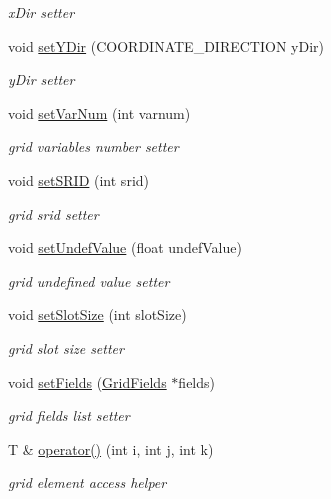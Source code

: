 \begin{DoxyCompactItemize}
\begin{DoxyCompactList}\small\item\em x\-Dir setter \end{DoxyCompactList}\item 
void \hyperlink{classfwi_1_1grid_1_1Grid_a8ee82188e306a47c14813024513bd56e}{set\-Y\-Dir} (C\-O\-O\-R\-D\-I\-N\-A\-T\-E\-\_\-\-D\-I\-R\-E\-C\-T\-I\-O\-N y\-Dir)
\begin{DoxyCompactList}\small\item\em y\-Dir setter \end{DoxyCompactList}\item 
void \hyperlink{classfwi_1_1grid_1_1Grid_ab063dbc1b9e23f21c27611851390de23}{set\-Var\-Num} (int varnum)
\begin{DoxyCompactList}\small\item\em grid variables number setter \end{DoxyCompactList}\item 
void \hyperlink{classfwi_1_1grid_1_1Grid_aff98dae08698282b2a1661810856e673}{set\-S\-R\-I\-D} (int srid)
\begin{DoxyCompactList}\small\item\em grid srid setter \end{DoxyCompactList}\item 
void \hyperlink{classfwi_1_1grid_1_1Grid_ad1090e0ab615bf979eb72bbc55ca6fb3}{set\-Undef\-Value} (float undef\-Value)
\begin{DoxyCompactList}\small\item\em grid undefined value setter \end{DoxyCompactList}\item 
void \hyperlink{classfwi_1_1grid_1_1Grid_ac0fe4e20d56ed5507f62c1d3e6502f68}{set\-Slot\-Size} (int slot\-Size)
\begin{DoxyCompactList}\small\item\em grid slot size setter \end{DoxyCompactList}\item 
void \hyperlink{classfwi_1_1grid_1_1Grid_acfa22cf6901ee071064d5dccc255f5ed}{set\-Fields} (\hyperlink{classfwi_1_1grid_1_1GridFields}{Grid\-Fields} $\ast$fields)
\begin{DoxyCompactList}\small\item\em grid fields list setter \end{DoxyCompactList}\item 
T \& \hyperlink{classfwi_1_1grid_1_1Grid_a4892438084efa099f29fbb4fbf5d3e83}{operator()} (int i, int j, int k)
\begin{DoxyCompactList}\small\item\em grid element access helper \end{DoxyCompactList}\item 

\end{DoxyCompactItemize}
